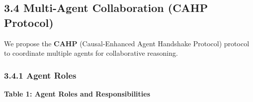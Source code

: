 \hypertarget{multi-agent-collaboration-cahp-protocol}{%
\subsection{3.4 Multi-Agent Collaboration (CAHP
Protocol)}\label{multi-agent-collaboration-cahp-protocol}}

We propose the \textbf{CAHP} (Causal-Enhanced Agent Handshake Protocol)
protocol to coordinate multiple agents for collaborative reasoning.

\hypertarget{agent-roles}{%
\subsubsection{3.4.1 Agent Roles}\label{agent-roles}}

\textbf{Table 1: Agent Roles and Responsibilities}

